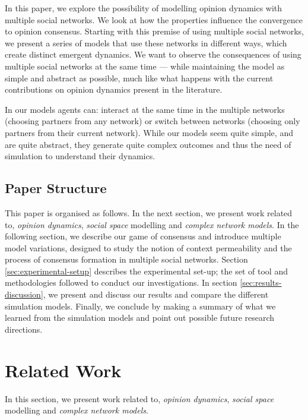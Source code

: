 \documentclass[preprint,number]{elsarticle}
\begin{document}
	In this paper, we explore the possibility of modelling opinion dynamics with multiple social networks. We look at how the properties influence the convergence to opinion consensus. Starting with this premise of 
	using multiple social networks, we present a series of models that use these networks in different ways, which create distinct emergent dynamics. We want to observe the consequences of using multiple social networks at the same time --- while maintaining the model as simple and abstract as possible, much like what happens with the current contributions on opinion dynamics present in the literature. 
	
	In our models agents can: interact at the same time in the multiple networks (choosing partners from any network) or switch between networks (choosing only partners from their current network). While our models seem quite simple, and are quite abstract, they generate quite complex outcomes and thus the need of simulation to understand their dynamics.
	
	\subsection{Paper Structure}
	This paper is organised as follows. In the next section, we present work related to, \textit{opinion dynamics}, \textit{social space} modelling and \textit{complex network models}. In the following section, we describe our game of consensus and introduce multiple model variations, designed to study the notion of context permeability and the process of consensus formation in multiple social networks. Section \ref{sec:experimental-setup} describes the experimental set-up; the set of tool and methodologies followed to conduct our investigations. In section \ref{sec:results-discussion}, we present and discuss our results and compare the different simulation models. Finally, we conclude by making a summary of what we learned from the simulation models and point out possible future research directions.
	
	\section{Related Work}
	\label{sec:relatedwork}
	In this section, we present work related to, \textit{opinion dynamics}, \textit{social space} modelling and \textit{complex network models}.	
\end{document}
